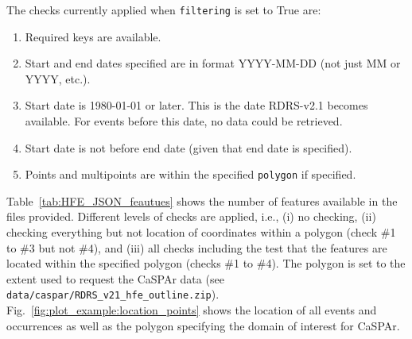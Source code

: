 \documentclass[10pt,a4paper,titlepage,parskip]{scrartcl}
\begin{document}
The checks currently applied when \texttt{filtering} is set to True are:
\begin{enumerate}[Check \#1.] 
	\item Required keys are available.
	\item Start and end dates specified are in format YYYY-MM-DD (not just MM or YYYY, etc.).
	\item Start date is 1980-01-01 or later. This is the date RDRS-v2.1 becomes available. For events before this date, no data could be retrieved.
	\item Start date is not before end date (given that end date is specified).
	\item Points and multipoints are within the specified \texttt{polygon} if specified.
\end{enumerate}

Table~\ref{tab:HFE_JSON_feautues} shows the number of features available in the files provided. Different levels of checks are applied, i.e., (i) no checking, (ii) checking everything but not location of coordinates within a polygon (check \#1 to \#3 but not \#4), and (iii) all checks including the test that the features are located within the specified polygon (checks \#1 to \#4). The polygon is set to the extent used to request the CaSPAr data (see \texttt{data/caspar/RDRS\_v21\_hfe\_outline.zip}). Fig.~\ref{fig:plot_example:location_points} shows the location of all events and occurrences as well as the polygon specifying the domain of interest for CaSPAr.
\end{document}
